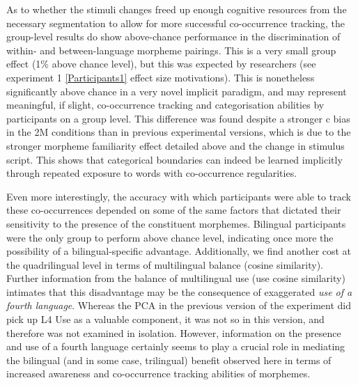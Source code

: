 As to whether the stimuli changes freed up enough cognitive resources from the necessary segmentation to allow for more successful co-occurrence tracking, the group-level results do show above-chance performance in the discrimination of within- and between-language morpheme pairings. This is a very small group effect (1\% above chance level), but this was expected by researchers (see experiment 1 \autoref{Participants1} effect size motivations). This is nonetheless significantly above chance in a very novel implicit paradigm, and may represent meaningful, if slight, co-occurrence tracking and categorisation abilities by participants on a group level. This difference was found despite a stronger c bias in the 2M conditions than in previous experimental versions, which is due to the stronger morpheme familiarity effect detailed above and the change in stimulus script. This shows that categorical boundaries can indeed be learned implicitly through repeated exposure to words with co-occurrence regularities. 

Even more interestingly, the accuracy with which participants were able to track these co-occurrences depended on some of the same factors that dictated their sensitivity to the presence of the constituent morphemes. Bilingual participants were the only group to perform above chance level, indicating once more the possibility of a bilingual-specific advantage. Additionally, we find another cost at the quadrilingual level in terms of multilingual balance (cosine similarity). Further information from the balance of multilingual use (use cosine similarity) intimates that this disadvantage may be the consequence of exaggerated \emph{use of a fourth language}. Whereas the PCA in the previous version of the experiment did pick up L4 Use as a valuable component, it was not so in this version, and therefore was not examined in isolation. However, information on the presence and use of a fourth language certainly seems to play a crucial role in mediating the bilingual (and in some case, trilingual) benefit observed here in terms of increased awareness and co-occurrence tracking abilities of morphemes. 






